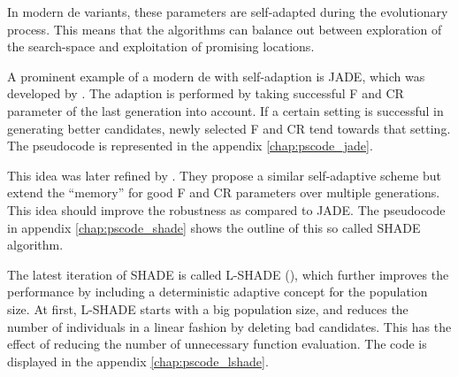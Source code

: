 \documentclass[./\jobname.tex,hidelinks]{subfiles}
\begin{document}
In modern \gls{de} variants, these parameters are self-adapted during the evolutionary process. This means that the algorithms can balance out between exploration of the search-space and exploitation of promising locations. 

A prominent example of a modern \gls{de} with self-adaption is JADE, which was developed by \cite{zhang_jade_2009}. The adaption is performed by taking successful F and CR parameter of the last generation into account. If a certain setting is successful in generating better candidates, newly selected F and CR tend towards that setting. The pseudocode is represented in the appendix \ref{chap:pscode_jade}. 

This idea was later refined by \cite{tanabe_success-history_2013}. They propose a similar self-adaptive scheme but extend the ``memory'' for good F and CR parameters over multiple generations. This idea should improve the robustness as compared to JADE. The pseudocode in appendix \ref{chap:pscode_shade} shows the outline of this so called SHADE algorithm. 

The latest iteration of SHADE is called L-SHADE (\cite{tanabe_improving_2014}), which further improves the performance by including a deterministic adaptive concept for the population size. At first, L-SHADE starts with a big population size, and reduces the number of individuals in a linear fashion by deleting bad candidates. This has the effect of reducing the number of unnecessary function evaluation. The code is displayed in the appendix \ref{chap:pscode_lshade}. 
\end{document}
